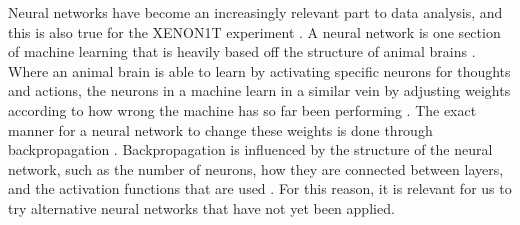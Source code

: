 \documentclass[../thesis.tex]{subfiles}
\begin{document}
Neural networks have become an increasingly relevant part to data analysis, and this is also true for the XENON1T experiment \cite{Bart}.
A neural network is one section of machine learning that is heavily based off the structure of animal brains \cite{deep-learning}.
Where an animal brain is able to learn by activating specific neurons for thoughts and actions, the neurons in a machine learn in a similar vein by adjusting weights according to how wrong the machine has so far been performing \cite{deep-learning}.
The exact manner for a neural network to change these weights is done through backpropagation \cite{deep-learning}.
Backpropagation is influenced by the structure of the neural network, such as the number of neurons, how they are connected between layers, and the activation functions that are used \cite{deep-learning}.
For this reason, it is relevant for us to try alternative neural networks that have not yet been applied.
\end{document}
